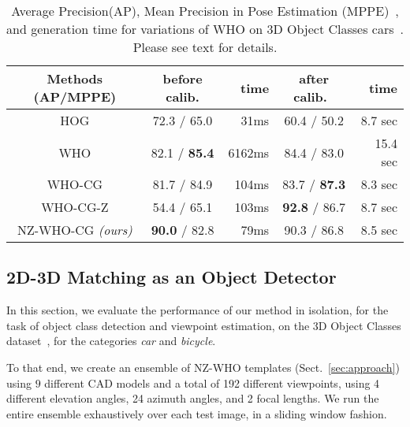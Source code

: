 \begin{table}[!htbp]
  \footnotesize
  \setlength{\tabcolsep}{1pt}
  \centering
  \begin{tabular}{|c|c|r|c|r|}
    \hline
    Methods (AP/MPPE) & before calib.  & time & after calib.~\cite{Aubry14} & time \\
    \hline\hline
    HOG\cite{Dalal05}      & 72.3 / 65.0          &  31ms  & 60.4 / 50.2           & 8.7 sec \\ 
    WHO\cite{Hariharan12}  & 82.1 / \textbf{85.4} &  6162ms& 84.4 / 83.0           & 15.4 sec\\
    WHO-CG                 & 81.7 / 84.9          &  104ms & 83.7 / \textbf{87.3}  & 8.3 sec \\
    WHO-CG-Z               & 54.4 / 65.1          &  103ms & \textbf{92.8} / 86.7  & 8.7 sec \\
    NZ-WHO-CG {\em (ours)} & \textbf{90.0} / 82.8 &   79ms & 90.3 / 86.8           & 8.5 sec \\
    \hline
  \end{tabular}
  \caption{Average Precision(AP), Mean Precision in Pose Estimation
    (MPPE)~\cite{Lopez-Sastre11}, and generation time for variations of WHO on
    3D Object Classes cars~\cite{Savarese07}. Please see text for
    details.}
  \label{tab:who_initializations}
\end{table}


\subsection{2D-3D Matching as an Object Detector} 
\label{sec:exp_iso}
In this section, we evaluate the performance of our method in
isolation, for the task of object class detection and viewpoint
estimation, on the 3D Object Classes dataset~\cite{Savarese07}, for the
categories {\em car} and {\em bicycle}.

To that end, we create an ensemble of NZ-WHO templates (Sect.~\ref{sec:approach})
using $9$ different CAD models and a total of 192 different
viewpoints, using 4 different elevation angles, 24 azimuth angles,
and 2 focal lengths. We run the entire ensemble exhaustively over
each test image, in a sliding window fashion.

